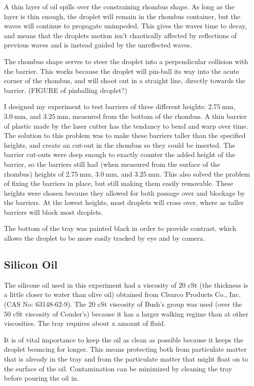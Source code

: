 A thin layer of oil spills over the constraining rhombus shape. As long as the layer is thin enough, the droplet will remain in the rhombus container, but the waves will continue to propagate unimpeded. This gives the waves time to decay, and means that the droplets motion isn't chaotically affected by reflections of previous waves and is instead guided by the unreflected waves. 

The rhombus shape serves to steer the droplet into a perpendicular collision with the barrier. This works because the droplet will pin-ball its way into the acute corner of the rhombus, and will shoot out in a straight line, directly towards the barrier.  (FIGURE of pinballing droplet?)

I designed my experiment to test barriers of three different heights: $2.75~\mathrm{mm}$, $3.0~\mathrm{mm}$, and $3.25~\mathrm{mm}$, measured from the bottom of the rhombus. A thin barrier of plastic made by the laser cutter has the tendancy to bend and warp over time. The solution to this problem was to make these barriers taller than the specified heights, and create an cut-out in the rhombus so they could be inserted. The barrier cut-outs were deep enough to exactly counter the added height of the barrier, so the barriers still had (when measured from the surface of the rhombus) heights of $2.75~\mathrm{mm}$, $3.0~\mathrm{mm}$, and $3.25~\mathrm{mm}$. This also solved the problem of fixing the barriers in place, but still making them easily removable. These heights were chosen because they allowed for both passage over and blockage by the barriers. At the lowest heights, most droplets will cross over, where as taller barriers will block most droplets. 


The bottom of the tray was painted black in order to provide contrast, which allows the droplet to be more easily tracked by eye and by camera.

\subsection{Silicon Oil}
    The silicone oil used in this experiment had a viscosity of 20 cSt (the thickness is a little closer to water than olive oil) obtained from Clearco Products Co., Inc. (CAS No: 63148-62-9). The 20 cSt viscosity of Bush's group was used (over the 50 cSt viscosity of Couder's) because it has a larger walking regime than at other viscosities. The tray requires about x amount of fluid.
    
    It is of vital importance to keep the oil as clean as possible because it keeps the droplet bouncing for longer. This means protecting both from particulate matter that is already in the tray and from the particulate matter that might float on to the surface of the oil. Contamination can be minimized by cleaning the tray before pouring the oil in.
    
